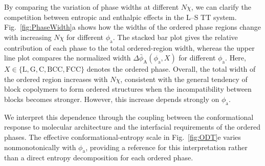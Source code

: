 By comparing the variation of phase widths at different $N\chi$, we can clarify the competition between entropic and enthalpic effects in the L--S TT system.
Fig.~\ref{fig:PhaseWidth}a shows how the widths of the ordered phase regions change with increasing $N\chi$ for different $\phi_{\mathrm a}$.
The stacked bar plot gives the relative contribution of each phase to the total ordered-region width, whereas the upper line plot compares the normalized width $\Delta\bar{\phi}_{\mathrm A}(\phi_{\mathrm a},X)$ for different $\phi_{\mathrm a}$.
Here, $X\in\{\mathrm{L},\mathrm{G},\mathrm{C},\mathrm{BCC},\mathrm{FCC}\}$ denotes the ordered phase.
Overall, the total width of the ordered region increases with $N\chi$, consistent with the general tendency of block copolymers to form ordered structures when the incompatibility between blocks becomes stronger.
However, this increase depends strongly on $\phi_{\mathrm a}$.

We interpret this dependence through the coupling between the conformational response to molecular architecture and the interfacial requirements of the ordered phases.
The effective conformational-entropy scale in Fig.~\ref{fig:ODT}e varies nonmonotonically with $\phi_{\mathrm a}$, providing a reference for this interpretation rather than a direct entropy decomposition for each ordered phase.

